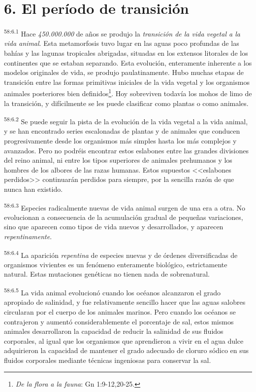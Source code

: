 \section*{6. El período de transición}
\par
\textsuperscript{58:6.1} Hace \textit{450.000.000} de años se produjo la \textit{transición de la vida vegetal a la vida animal}. Esta metamorfosis tuvo lugar en las aguas poco profundas de las bahías y las lagunas tropicales abrigadas, situadas en los extensos litorales de los continentes que se estaban separando. Esta evolución, enteramente inherente a los modelos originales de vida, se produjo paulatinamente. Hubo muchas etapas de transición entre las formas primitivas iniciales de la vida vegetal y los organismos animales posteriores bien definidos\footnote{\textit{De la flora a la fauna}: Gn 1:9-12,20-25.}. Hoy sobreviven todavía los mohos de limo de la transición, y difícilmente se les puede clasificar como plantas o como animales.

\par
\textsuperscript{58:6.2} Se puede seguir la pista de la evolución de la vida vegetal a la vida animal, y se han encontrado series escalonadas de plantas y de animales que conducen progresivamente desde los organismos más simples hasta los más complejos y avanzados. Pero no podréis encontrar estos eslabones entre las grandes divisiones del reino animal, ni entre los tipos superiores de animales prehumanos y los hombres de los albores de las razas humanas. Estos supuestos <<eslabones perdidos>> continuarán perdidos para siempre, por la sencilla razón de que nunca han existido.

\par
\textsuperscript{58:6.3} Especies radicalmente nuevas de vida animal surgen de una era a otra. No evolucionan a consecuencia de la acumulación gradual de pequeñas variaciones, sino que aparecen como tipos de vida nuevos y desarrollados, y aparecen \textit{repentinamente}.

\par
\textsuperscript{58:6.4} La aparición \textit{repentina} de especies nuevas y de órdenes diversificadas de organismos vivientes es un fenómeno enteramente biológico, estrictamente natural. Estas mutaciones genéticas no tienen nada de sobrenatural.

\par
\textsuperscript{58:6.5} La vida animal evolucionó cuando los océanos alcanzaron el grado apropiado de salinidad, y fue relativamente sencillo hacer que las aguas salobres circularan por el cuerpo de los animales marinos. Pero cuando los océanos se contrajeron y aumentó considerablemente el porcentaje de sal, estos mismos animales desarrollaron la capacidad de reducir la salinidad de sus fluidos corporales, al igual que los organismos que aprendieron a vivir en el agua dulce adquirieron la capacidad de mantener el grado adecuado de cloruro sódico en sus fluidos corporales mediante técnicas ingeniosas para conservar la sal.

